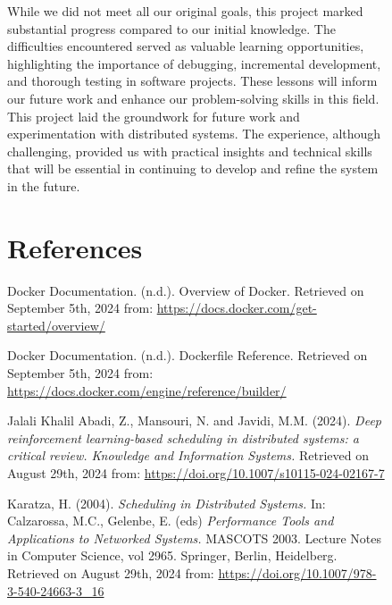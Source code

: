 \documentclass{article}
\begin{document}
\begin{figure}[h!]
While we did not meet all our original goals, this project marked substantial progress compared to our initial knowledge. The difficulties encountered served as valuable learning opportunities, highlighting the importance of debugging, incremental development, and thorough testing in software projects. These lessons will inform our future work and enhance our problem-solving skills in this field.\\

This project laid the groundwork for future work and experimentation with distributed systems. The experience, although challenging, provided us with practical insights and technical skills that will be essential in continuing to develop and refine the system in the future.

\section{References}

\begin{hangparas}{1cm}{1}
Docker Documentation. (n.d.). Overview of Docker. Retrieved on September 5th, 2024 from: \url{https://docs.docker.com/get-started/overview/}
\end{hangparas}

\vspace{0.5cm}

\begin{hangparas}{1cm}{1}
Docker Documentation. (n.d.). Dockerfile Reference. Retrieved on September 5th, 2024 from: \url{https://docs.docker.com/engine/reference/builder/}
\end{hangparas}

\vspace{0.5cm}

\begin{hangparas}{1cm}{1}
Jalali Khalil Abadi, Z., Mansouri, N. and Javidi, M.M. (2024). \textit{Deep reinforcement learning-based scheduling in distributed systems: a critical review. Knowledge and Information Systems.} Retrieved on August 29th, 2024 from: \url{https://doi.org/10.1007/s10115-024-02167-7}
\end{hangparas}

\vspace{0.5cm}

\begin{hangparas}{1cm}{1}
Karatza, H. (2004). \textit{Scheduling in Distributed Systems.} In: Calzarossa, M.C., Gelenbe, E. (eds) \textit{Performance Tools and Applications to Networked Systems.} MASCOTS 2003. Lecture Notes in Computer Science, vol 2965. Springer, Berlin, Heidelberg. Retrieved on August 29th, 2024 from: \url{https://doi.org/10.1007/978-3-540-24663-3_16}
\end{hangparas}


\end{figure}
\end{document}
